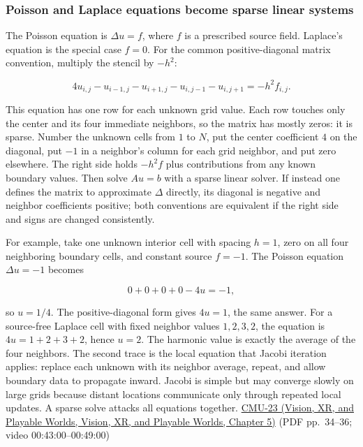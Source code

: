 \subsubsection{Poisson and Laplace equations become sparse linear systems}\label{04-visual-computing-ii-ch030-poisson-and-laplace-equations-become-sparse-linear-systems}

The Poisson equation is \(\Delta u=f\), where \(f\) is a prescribed source field. Laplace's equation is the special case \(f=0\). For the common positive-diagonal matrix convention, multiply the stencil by \(-h^2\):

\[
4u_{i,j}-u_{i-1,j}-u_{i+1,j}-u_{i,j-1}-u_{i,j+1}=-h^2f_{i,j}.
\]

This equation has one row for each unknown grid value. Each row touches only the center and its four immediate neighbors, so the matrix has mostly zeros: it is sparse. Number the unknown cells from \(1\) to \(N\), put the center coefficient \(4\) on the diagonal, put \(-1\) in a neighbor's column for each grid neighbor, and put zero elsewhere. The right side holds \(-h^2f\) plus contributions from any known boundary values. Then solve \(Au=b\) with a sparse linear solver. If instead one defines the matrix to approximate \(\Delta\) directly, its diagonal is negative and neighbor coefficients positive; both conventions are equivalent if the right side and signs are changed consistently.

For example, take one unknown interior cell with spacing \(h=1\), zero on all four neighboring boundary cells, and constant source \(f=-1\). The Poisson equation \(\Delta u=-1\) becomes

\[
0+0+0+0-4u=-1,
\]

so \(u=1/4\). The positive-diagonal form gives \(4u=1\), the same answer. For a source-free Laplace cell with fixed neighbor values \(1,2,3,2\), the equation is \(4u=1+2+3+2\), hence \(u=2\). The harmonic value is exactly the average of the four neighbors. The second trace is the local equation that Jacobi iteration applies: replace each unknown with its neighbor average, repeat, and allow boundary data to propagate inward. Jacobi is simple but may converge slowly on large grids because distant locations communicate only through repeated local updates. A sparse solve attacks all equations together. \href{../07-Vision-XR-and-Playable-Worlds/main.pdf\#nameddest=04-visual-computing-ii-ch036-cmu-23---physically-based-animation-and-pdes}{CMU-23 (Vision, XR, and Playable Worlds, Vision, XR, and Playable Worlds, Chapter 5)} (PDF pp.~34--36; video 00:43:00--00:49:00)

